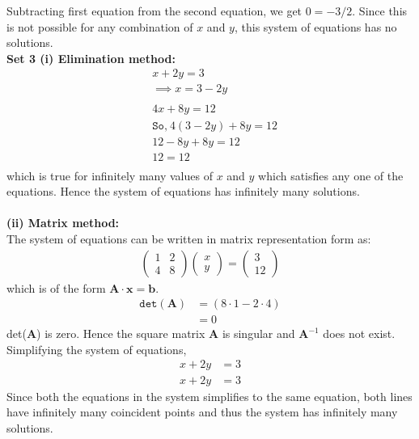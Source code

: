 \documentclass[12pt,letterpaper,fleqn]{article}
\theoremstyle{definition}
\begin{document}
	Subtracting first equation from the second equation, we get $0 = -3/2$. Since this is not possible for any combination of $x$ and $y$, this system of equations has no solutions.\\
	\textbf{Set 3 (i) Elimination method:}
	\begin{equation*}
	\begin{split}
	&x + 2y = 3\\
	&\implies x = 3 -2y\\
	\\
	&4x + 8y = 12\\
	&\texttt{So,}~4(3- 2y) + 8y = 12\\
	&12 - 8y + 8y = 12\\
	&12 = 12 \\
	\end{split}
	\end{equation*}
	which is true for infinitely many values of $x$ and $y$ which satisfies any one of the equations. Hence the system of equations has infinitely many solutions.\\
	\\
	\textbf{ (ii) Matrix method:}\\
	The system of equations can be written in matrix representation form as:
	\begin{equation*}
	\begin{split}
	\begin{pmatrix}
	1 &2\\
	4 &8
	\end{pmatrix}
	\begin{pmatrix}
	x\\
	y
	\end{pmatrix} =
	\begin{pmatrix}
	3\\
	12
	\end{pmatrix}
	\end{split}
	\end{equation*}
	which is of the form $\textbf{A}\cdot \textbf{x} = \textbf{b}$.
	\begin{equation*}
	\begin{split}
	\texttt{det}(\textbf{A}) &= ( 8 \cdot 1 - 2 \cdot 4 )\\
	&= 0
	\end{split}
	\end{equation*}
	det(\textbf{A}) is zero. Hence the square matrix \textbf{A} is singular and $\textbf{A}^{-1}$ does not exist.\\
	Simplifying the system of equations,
	\begin{equation*}
	\begin{split}
	x + 2y &= 3\\
	x + 2y &= 3
	\end{split}
	\end{equation*}
	Since both the equations in the system simplifies to the same equation, both lines have infinitely many coincident points and thus the system has infinitely many solutions.\\
\newpage
\end{document}
